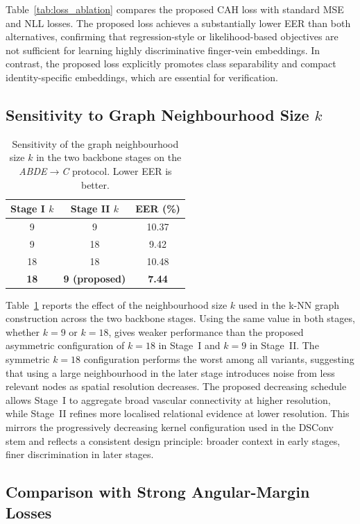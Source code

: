 \documentclass[10pt,journal,compsoc]{IEEEtran}
\begin{document}
Table~\ref{tab:loss_ablation} compares the proposed CAH loss with standard MSE and NLL losses. The proposed loss achieves a substantially lower EER than both alternatives, confirming that regression-style or likelihood-based objectives are not sufficient for learning highly discriminative finger-vein embeddings. In contrast, the proposed loss explicitly promotes class separability and compact identity-specific embeddings, which are essential for verification.
\subsection{Sensitivity to Graph Neighbourhood Size $k$}
\begin{table}[t]
\centering
\caption{Sensitivity of the graph neighbourhood size $k$ in
the two backbone stages on the \textit{ABDE}$\rightarrow$\textit{C}
protocol. Lower EER is better.}
\begin{tabular}{ccc}
\hline
Stage I $k$ & Stage II $k$ & EER (\%) \\
\hline
9  & 9  & 10.37 \\
9  & 18 & 9.42  \\
18 & 18 & 10.48 \\
\textbf{18} & \textbf{9 (proposed)} & \textbf{7.44} \\
\hline
\end{tabular}
\label{tab:graph_k_sensitivity}
\end{table}
Table~\ref{tab:graph_k_sensitivity} reports the effect of the
neighbourhood size $k$ used in the k-NN graph construction
across the two backbone stages. Using the same value in both
stages, whether $k{=}9$ or $k{=}18$, gives weaker performance
than the proposed asymmetric configuration of $k{=}18$ in
Stage~I and $k{=}9$ in Stage~II. The symmetric $k{=}18$
configuration performs the worst among all variants, suggesting
that using a large neighbourhood in the later stage introduces
noise from less relevant nodes as spatial resolution decreases.
The proposed decreasing schedule allows Stage~I to aggregate
broad vascular connectivity at higher resolution, while
Stage~II refines more localised relational evidence at lower
resolution. This mirrors the progressively decreasing kernel
configuration used in the DSConv stem and reflects a consistent
design principle: broader context in early stages, finer
discrimination in later stages.
\subsection{Comparison with Strong Angular-Margin Losses}
\end{document}
